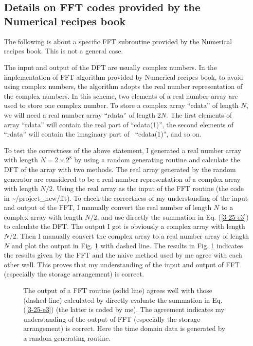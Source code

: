 \documentclass{article}
\begin{document}
\

\

\subsection{Details on FFT codes provided by the Numerical recipes
book{\cite{press1992}}}

The following is about a specific FFT subroutine provided by the Numerical
recipes book{\cite{press1992}}. This is not a general case.

The input and output of the DFT are usually complex numbers. In the
implementation of FFT algorithm provided by Numerical recipes
book{\cite{press1992}}, to avoid using complex numbers, the algorithm adopts
the real number representation of the complex numbers. In this scheme, two
elements of a real number array are used to store one complex number. To store
a complex array ``cdata'' of length $N$, we will need a real number array
``rdata'' of length $2 N$. The first elements of array ``rdata'' will contain
the real part of ``cdata(1)'', the second elements of ``rdata'' will contain
the imaginary part of \ ``cdata(1)'', and so on.

To test the correctness of the above statement, I generated a real number
array with length $N = 2 \times 2^8$ by using a random generating routine and
calculate the DFT of the array with two methods. The real array generated by
the random generator are considered to be a real number representation of a
complex array with length $N / 2$. Using the real array as the input of the
FFT routine (the code in \~{}/project\_new/fft). To check the correctness of
my understanding of the input and output of the FFT, I manually convert the
real number of length $N$ to a complex array with length $N / 2$, and use
directly the summation in Eq. (\ref{3-25-e3}) to calculate the DFT. The output
I got is obviously a complex array with length $N / 2$. Then I manually
convert the complex array to a real number array of length $N$ and plot the
output in Fig. \ref{3-25-e8} with dashed line. The results in Fig.
\ref{3-25-e8} indicates the results given by the FFT and the naive method used
by me agree with each other well. This proves that my understanding of the
input and output of FFT (especially the storage arrangement) is correct.

\begin{figure}[h]
  \caption{\label{3-25-e8}The output of a FFT routine (solid line) agrees well
  with those (dashed line) calculated by directly evaluate the summation in
  Eq. (\ref{3-25-e3}) (the latter is coded by me). The agreement indicates my
  understanding of the output of FFT (especially the storage arrangement) is
  correct. Here the time domain data is generated by a random generating
  routine. }
\end{figure}
\end{document}
